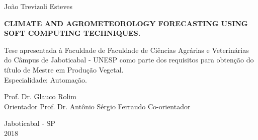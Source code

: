 \clearpage

\thispagestyle{empty}

\centerline{{\normalsize{João Trevizoli Esteves}}}

\vspace*{4.5cm}


\begin{center}
\Large\textrm{\textbf{
CLIMATE AND AGROMETEOROLOGY FORECASTING USING SOFT COMPUTING TECHNIQUES.}} %
\end{center}
\vspace*{5cm}

\hspace*{7.3cm} 
\begin{minipage}[b]{0.45\linewidth}
  \begin{espacosimples}
    Tese apresentada à Faculdade de Faculdade de Ciências Agrárias e Veterinárias do Câmpus de Jaboticabal - UNESP como parte dos requisitos para obtenção do título de Mestre em Produção Vegetal. \\
Especialidade: Automação.
  \end{espacosimples}
\end{minipage}


\vspace*{0.5cm}

\begin{flushleft}
\begin{espacosimples}
\normalsize
\hspace*{8.0cm} Prof. Dr. Glauco Rolim \\[0.5ex]
\hspace*{8.0cm} Orientador
\hspace*{8.0cm} Prof. Dr. Antônio Sérgio Ferraudo
\hspace*{8.0cm} Co-orientador
\end{espacosimples}
\end{flushleft}


\vspace*{2.0cm}
\begin{center}
Jaboticabal - SP\\ 2018
\end{center}


